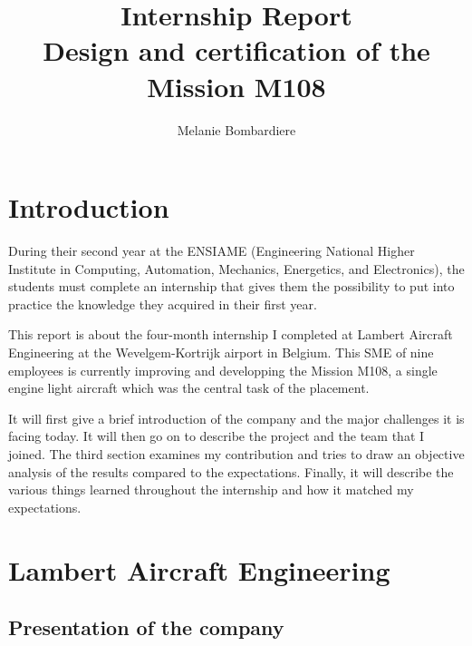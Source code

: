 \documentclass[11pt,a4paper]{article}
\begin{document}
\title{\textbf{Internship Report\\Design and certification of the Mission M108}}

\author{Melanie Bombardiere}

\maketitle

\pagestyle{fancy}
\fancyhead{}

\newpage

\tableofcontents

\newpage

\section{Introduction}

During their second year at the ENSIAME (Engineering National Higher Institute in Computing, Automation, Mechanics, Energetics, and Electronics), the students must complete an internship that gives them the possibility to put into practice the knowledge they acquired in their first year.

\bigskip

This report is about the four-month internship I completed at Lambert Aircraft Engineering at the Wevelgem-Kortrijk airport in Belgium. This SME of nine employees is currently improving and developping the Mission M108, a single engine light aircraft which was the central task of the placement.

\bigskip

It will first give a brief introduction of the company and the major challenges it is facing today. It will then go on to describe the project and the team that I joined. The third section examines my contribution and tries to draw an objective analysis of the results compared to the expectations. Finally, it will describe the various things learned throughout the internship and how it matched my expectations.

\newpage

\section{Lambert Aircraft Engineering}

\subsection{Presentation of the company}
\end{document}
